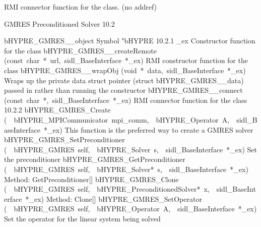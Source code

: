 \documentclass{article}
\begin{document}
\begin{cxxentry}
\begin{cxxentry}
\begin{cxxvariable}
\begin{cxxdoc}
RMI connector function for the class. (no addref)
\end{cxxdoc}
\end{cxxvariable}
\end{cxxentry}
\begin{cxxentry}
{}
        {GMRES Preconditioned Solver}
        {}
        {
}
        {10.2}
\begin{cxxnames}
        {bHYPRE\_GMRES\_\_object}
        {}
        {
Symbol "bHYPRE}
        {10.2.1}
        {\_ex}
        {}
        {
Constructor function for the class}
        {}
\label{cxx.10.2.11}
        {bHYPRE\_GMRES\_\_createRemote}
        {(const\ char\ *\ url,\ sidl\_BaseInterface\ *\_ex)}
        {
RMI constructor function for the class}
        {}
\label{cxx.10.2.12}
        {bHYPRE\_GMRES\_\_wrapObj}
        {(void\ *\ data,\ sidl\_BaseInterface\ *\_ex)}
        {
Wraps up the private data struct pointer (struct bHYPRE\_GMRES\_\_data) passed in rather than running the constructor}
        {}
\label{cxx.10.2.13}
        {bHYPRE\_GMRES\_\_connect}
        {(const\ char\ *,\ sidl\_BaseInterface\ *\_ex)}
        {
RMI connector function for the class}
        {10.2.2}
        {bHYPRE\_GMRES\_Create}
        {(\ \ bHYPRE\_MPICommunicator\ mpi\_comm,\ \ bHYPRE\_Operator\ A,\ \ sidl\_BaseInterface\ *\_ex)}
        {
This function is the preferred way to create a GMRES solver}
        {}
\label{cxx.10.2.14}
        {bHYPRE\_GMRES\_SetPreconditioner}
        {(\ \ bHYPRE\_GMRES\ self,\ \ bHYPRE\_Solver\ s,\ \ sidl\_BaseInterface\ *\_ex)}
        {
Set the preconditioner}
        {}
\label{cxx.10.2.15}
        {bHYPRE\_GMRES\_GetPreconditioner}
        {(\ \ bHYPRE\_GMRES\ self,\ \ bHYPRE\_Solver*\ s,\ \ sidl\_BaseInterface\ *\_ex)}
        {
Method:  GetPreconditioner[]}
        {}
\label{cxx.10.2.16}
        {bHYPRE\_GMRES\_Clone}
        {(\ \ bHYPRE\_GMRES\ self,\ \ bHYPRE\_PreconditionedSolver*\ x,\ \ sidl\_BaseInterface\ *\_ex)}
        {
Method:  Clone[]}
        {}
\label{cxx.10.2.17}
        {bHYPRE\_GMRES\_SetOperator}
        {(\ \ bHYPRE\_GMRES\ self,\ \ bHYPRE\_Operator\ A,\ \ sidl\_BaseInterface\ *\_ex)}
        {
Set the operator for the linear system being solved}

\end{cxxnames}
\end{cxxentry}
\end{cxxentry}
\end{document}
